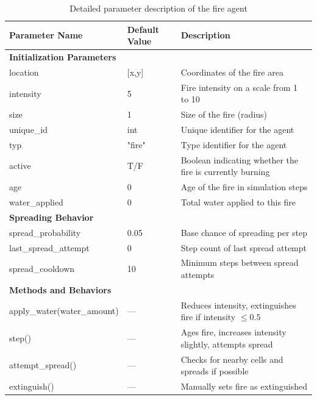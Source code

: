 \documentclass[11pt, a4paper]{article}
\begin{document}
\begin{table}[htbp]
\centering
\caption{Detailed parameter description of the fire agent}
\label{tab:fire_agent_parameters}
\small
\begin{tabular}{@{}p{4cm}p{2cm}p{6cm}@{}}
\toprule
\textbf{Parameter Name} & \textbf{Default Value} & \textbf{Description} \\
\midrule
\multicolumn{3}{l}{\textbf{Initialization Parameters}} \\
\midrule
location & [x,y] & Coordinates of the fire area \\
intensity & 5 & Fire intensity on a scale from 1 to 10 \\
size & 1 & Size of the fire (radius) \\
unique\_id & int & Unique identifier for the agent \\
typ & "fire" & Type identifier for the agent \\
active & T/F & Boolean indicating whether the fire is currently burning \\
age & 0 & Age of the fire in simulation steps \\
water\_applied & 0 & Total water applied to this fire \\
\midrule
\multicolumn{3}{l}{\textbf{Spreading Behavior}} \\
\midrule
spread\_probability & 0.05 & Base chance of spreading per step \\
last\_spread\_attempt & 0 & Step count of last spread attempt \\
spread\_cooldown & 10 & Minimum steps between spread attempts \\
\midrule
\multicolumn{3}{l}{\textbf{Methods and Behaviors}} \\
\midrule
apply\_water(water\_amount) & — & Reduces intensity, extinguishes fire if intensity $\leq 0.5$ \\
step() & — & Ages fire, increases intensity slightly, attempts spread \\
attempt\_spread() & — & Checks for nearby cells and spreads if possible \\
extinguish() & — & Manually sets fire as extinguished \\
\bottomrule
\end{tabular}
\end{table}
\end{document}
